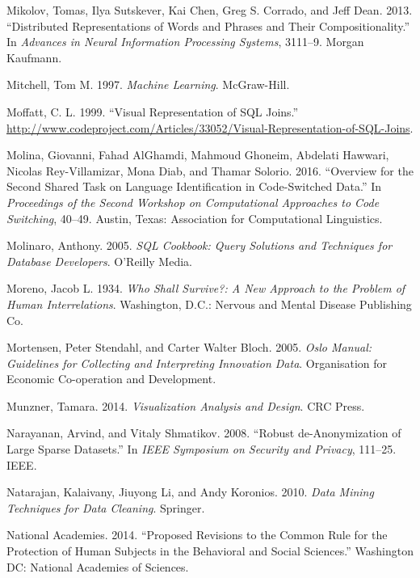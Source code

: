 \documentclass[]{krantz}
\begin{document}
\hypertarget{ref-mikolov-13}{}
Mikolov, Tomas, Ilya Sutskever, Kai Chen, Greg S. Corrado, and Jeff
Dean. 2013. ``Distributed Representations of Words and Phrases and Their
Compositionality.'' In \emph{Advances in Neural Information Processing
Systems}, 3111--9. Morgan Kaufmann.

\hypertarget{ref-mitchell1997machine}{}
Mitchell, Tom M. 1997. \emph{Machine Learning}. McGraw-Hill.

\hypertarget{ref-vizjoins}{}
Moffatt, C. L. 1999. ``Visual Representation of SQL Joins.''
\url{http://www.codeproject.com/Articles/33052/Visual-Representation-of-SQL-Joins}.

\hypertarget{ref-molina-16}{}
Molina, Giovanni, Fahad AlGhamdi, Mahmoud Ghoneim, Abdelati Hawwari,
Nicolas Rey-Villamizar, Mona Diab, and Thamar Solorio. 2016. ``Overview
for the Second Shared Task on Language Identification in Code-Switched
Data.'' In \emph{Proceedings of the Second Workshop on Computational
Approaches to Code Switching}, 40--49. Austin, Texas: Association for
Computational Linguistics.

\hypertarget{ref-SQLCookbook}{}
Molinaro, Anthony. 2005. \emph{SQL Cookbook: Query Solutions and
Techniques for Database Developers}. O'Reilly Media.

\hypertarget{ref-moreno1934}{}
Moreno, Jacob L. 1934. \emph{Who Shall Survive?: A New Approach to the
Problem of Human Interrelations}. Washington, D.C.: Nervous and Mental
Disease Publishing Co.

\hypertarget{ref-oecd2005measurement}{}
Mortensen, Peter Stendahl, and Carter Walter Bloch. 2005. \emph{Oslo
Manual: Guidelines for Collecting and Interpreting Innovation Data}.
Organisation for Economic Co-operation and Development.

\hypertarget{ref-munzner2014visualization}{}
Munzner, Tamara. 2014. \emph{Visualization Analysis and Design}. CRC
Press.

\hypertarget{ref-narayanan2008robust}{}
Narayanan, Arvind, and Vitaly Shmatikov. 2008. ``Robust de-Anonymization
of Large Sparse Datasets.'' In \emph{IEEE Symposium on Security and
Privacy}, 111--25. IEEE.

\hypertarget{ref-natarajan2010data}{}
Natarajan, Kalaivany, Jiuyong Li, and Andy Koronios. 2010. \emph{Data
Mining Techniques for Data Cleaning}. Springer.

\hypertarget{ref-NationalAcademies2014}{}
National Academies. 2014. ``Proposed Revisions to the Common Rule for
the Protection of Human Subjects in the Behavioral and Social
Sciences.'' Washington DC: National Academies of Sciences.
\end{document}
